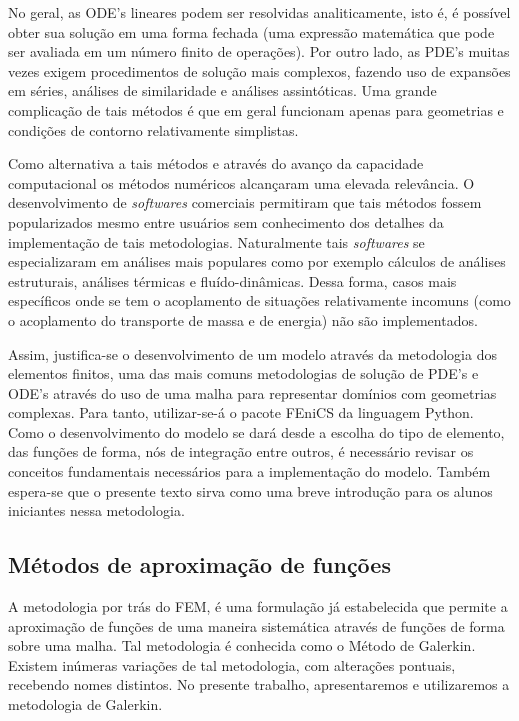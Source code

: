 No geral, as ODE's lineares podem ser resolvidas analiticamente, isto é, é possível obter sua solução em uma forma fechada (uma expressão matemática que pode ser avaliada em um número finito de operações). Por outro lado, as PDE's muitas vezes exigem procedimentos de solução mais complexos, fazendo uso de expansões em séries, análises de similaridade e análises assintóticas. Uma grande
complicação de tais métodos é que em geral funcionam apenas para geometrias e condições de contorno relativamente simplistas.

Como alternativa a tais métodos e através do avanço da capacidade computacional os métodos numéricos alcançaram uma elevada relevância. O desenvolvimento de \textit{softwares} comerciais permitiram que tais métodos fossem popularizados mesmo entre usuários sem conhecimento dos detalhes da implementação de tais metodologias. Naturalmente tais \textit{softwares} se especializaram em análises mais populares como por exemplo cálculos de análises estruturais, análises térmicas e fluído-dinâmicas. Dessa forma, casos mais específicos onde se tem o acoplamento de situações relativamente incomuns (como o acoplamento do transporte de massa e de energia) não são implementados.

Assim, justifica-se o desenvolvimento de um modelo através da metodologia dos elementos finitos, uma das mais comuns metodologias de solução de PDE's e ODE's através do uso de uma malha para representar domínios com geometrias complexas. Para tanto, utilizar-se-á o pacote FEniCS da linguagem Python. Como o desenvolvimento do modelo se dará desde a escolha do tipo de elemento, das funções de forma, nós de integração entre outros, é necessário revisar os conceitos fundamentais necessários para a implementação do modelo. Também espera-se que o presente texto sirva como uma breve introdução para os alunos iniciantes nessa metodologia.

	\subsection{Métodos de aproximação de funções}
	A metodologia por trás do FEM, é uma formulação já estabelecida que permite a aproximação de funções de uma maneira sistemática através de funções de forma sobre uma malha. Tal metodologia é conhecida como o Método de Galerkin. Existem inúmeras variações de tal metodologia, com alterações pontuais, recebendo nomes distintos. No presente trabalho, apresentaremos e utilizaremos a metodologia de Galerkin.

